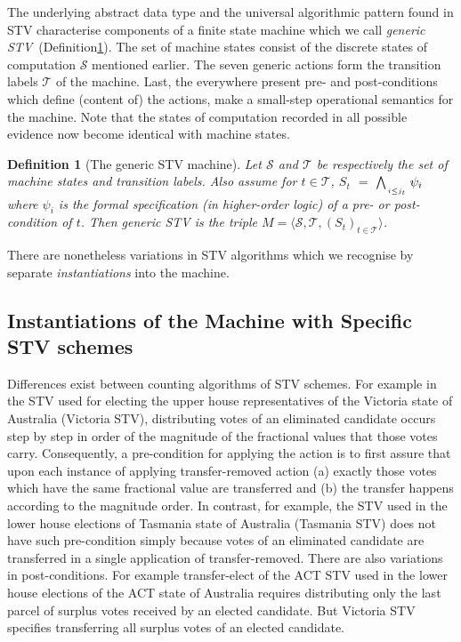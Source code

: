\documentclass[10pt,conference]{IEEEtran}
\newtheorem{definition}{Definition}
\begin{document}
The underlying abstract data type and the universal algorithmic pattern found in STV characterise components of a finite state machine which we call \emph{generic STV}~(Definition\ref{STVMachine}). The set of machine states consist of the discrete states of computation $\mathcal{S}$ mentioned earlier. The seven generic actions form the transition labels $\mathcal{T}$ of the machine. Last, the everywhere present pre- and post-conditions which define (content of)  the actions, make a small-step operational semantics for the machine.  
Note that the states of computation recorded in all possible  evidence now become identical with machine states.


\begin{definition}[The generic STV machine]\label{STVMachine}
Let $\mathcal{S}$  and $\mathcal{T}$
be respectively the set of machine states and transition labels.  Also assume for $t\in\mathcal{T}$, $S_{t}$ $=$ $\bigwedge_{\atop{i\leq j_{t}}} \psi_{i}$ where  $\psi_{i}$ is the formal specification (in higher-order logic) of a pre- or post-condition of $t$. Then \emph{generic STV} is the triple $M = \langle \mathcal{S}, \mathcal{T}, (S_t)_{t \in \mathcal{T}} \rangle$.  
\end{definition}
There are nonetheless variations in STV algorithms  which we  recognise  by separate \emph{instantiations} into the machine.  
\subsection{Instantiations of the Machine with Specific STV schemes}
Differences exist between counting algorithms of STV schemes.  
 For example in the STV used for electing the upper house representatives of the Victoria state of Australia (Victoria STV), distributing votes of an eliminated candidate occurs step by step in order of the magnitude of the fractional values that those votes carry.  Consequently, a pre-condition for applying the action is to first assure that upon each instance of applying transfer-removed action (a) exactly those votes which have the same fractional value are transferred and (b) the transfer happens according to the magnitude order. In contrast, for example, the STV used in the lower house elections of Tasmania state of Australia (Tasmania STV) does not have such pre-condition simply because votes of an eliminated candidate are transferred in a single application of transfer-removed. There are also variations in post-conditions. For example transfer-elect of the ACT STV used in the lower house elections of the ACT state of Australia requires distributing only the last parcel of surplus votes received by an elected candidate. But Victoria STV specifies transferring all surplus votes of an elected candidate.  
\end{document}
